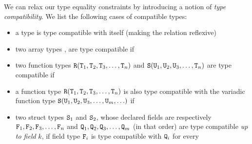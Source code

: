 We can relax our type equality constraints by introducing a notion of
\emph{type compatibility}. We list the following cases of compatible
types:
\begin{itemize}[--]
\item a type is type compatible with itself (making the relation
  reflexive)
\item two array types ,  are type compatible if
\item two function types
  \(\texttt{R} (\texttt{T}_1, \texttt{T}_2, \texttt{T}_3, \ldots, \texttt{T}_n)\) and
  \(\texttt{S} (\texttt{U}_1, \texttt{U}_2, \texttt{U}_3, \ldots, \texttt{T}_n)\) are type
  compatible if
\item a function type
  \(\texttt{R} (\texttt{T}_1, \texttt{T}_2, \texttt{T}_3, \ldots, \texttt{T}_n)\) is also
  type compatible with the variadic function type
  \(\texttt{S} (\texttt{U}_1, \texttt{U}_2, \texttt{U}_3, \ldots, \texttt{U}_m, \ldots)\)
  if
\item two struct types \(\texttt{S}_1\) and \(\texttt{S}_2\), whose declared
  fields are respectively
  \(\texttt{F}_1, \texttt{F}_2, \texttt{F}_3, \ldots, \texttt{F}_n\) and
  \(\texttt{Q}_1, \texttt{Q}_2, \texttt{Q}_3, \ldots, \texttt{Q}_m\) (in that order)
  are type compatible \emph{up to field} \(k\), if field type
  \(\texttt{F}_i\) is type compatible with \(\texttt{Q}_i\) for every

\end{itemize}
